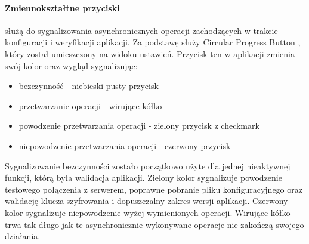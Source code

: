 \documentclass[archivemod, eng]{mgr}
\begin{document}
				\paragraph{Zmiennokształtne przyciski}
				służą do sygnalizowania asynchronicznych operacji zachodzących w trakcie konfiguracji i weryfikacji aplikacji. Za podstawę służy Circular Progress Button \cite{circularprogressbutton}, który został umieszczony na widoku ustawień. Przycisk ten w aplikacji zmienia swój kolor oraz wygląd sygnalizując:
				\begin{itemize}
					\item bezczynność - niebieski pusty przycisk
					\item przetwarzanie operacji - wirujące kółko
					\item powodzenie przetwarzania operacji - zielony przycisk z checkmark
					\item niepowodzenie przetwarzania operacji - czerwony przycisk 
				\end{itemize}
				Sygnalizowanie bezczynności zostało początkowo użyte dla jednej nieaktywnej funkcji, którą była walidacja aplikacji. Zielony kolor sygnalizuje powodzenie testowego połączenia z serwerem, poprawne pobranie pliku konfiguracyjnego oraz walidację klucza szyfrowania i dopuszczalny zakres wersji aplikacji.
				Czerwony kolor sygnalizuje niepowodzenie wyżej wymienionych operacji.
				Wirujące kółko trwa tak długo jak te asynchronicznie wykonywane operacje nie zakończą swojego działania.\\
				
\end{document}
